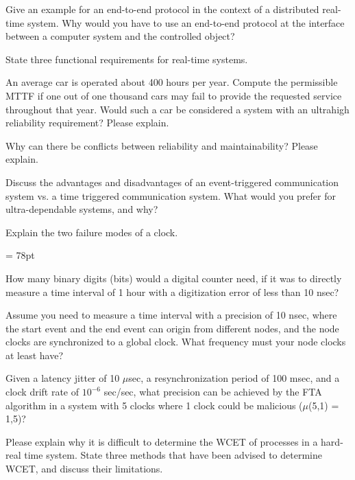 
 Give an example for an end-to-end protocol in the context of a distributed real-time system.
Why would you have to use an end-to-end protocol at the interface between a computer
system and the controlled object?


State three functional requirements for real-time systems.


An average car is operated about 400 hours per year. Compute the permissible MTTF if one
out of one thousand cars may fail to provide the requested service throughout that year.
Would such a car be considered a system with an ultrahigh reliability requirement? Please
explain.


Why can there be conflicts between reliability and maintainability? Please explain.


Discuss the advantages and disadvantages of an event-triggered communication system vs.
a time triggered communication system. What would you prefer for ultra-dependable
systems, and why?


Explain the two failure modes of a clock.

\pagebreak
\headheight = 78pt


 How many binary digits (bits) would a digital counter need, if it was to directly measure a
time interval of 1 hour with a digitization error of less than 10 nsec?


Assume you need to measure a time interval with a precision of 10 nsec, where the start
event and the end event can origin from different nodes, and the node clocks are
synchronized to a global clock. What frequency must your node clocks at least have?



 Given a latency jitter of 10 $\mu$sec, a resynchronization period of 100 msec, and a clock drift
rate of $10^{-6}$ sec/sec, what precision can be achieved by the FTA algorithm in a system with
5 clocks where 1 clock could be malicious ($\mu$(5,1) = 1,5)?


Please explain why it is difficult to determine the WCET of processes in a hard-real time
system. State three methods that have been advised to determine WCET, and discuss their
limitations.

